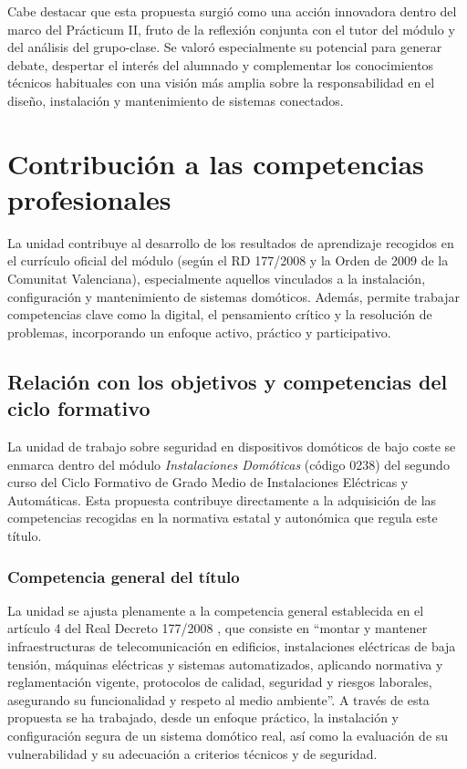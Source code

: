 Cabe destacar que esta propuesta surgió como una acción innovadora dentro del marco del Prácticum II, fruto de la reflexión conjunta con el tutor del módulo y del análisis del grupo-clase. Se valoró especialmente su potencial para generar debate, despertar el interés del alumnado y complementar los conocimientos técnicos habituales con una visión más amplia sobre la responsabilidad en el diseño, instalación y mantenimiento de sistemas conectados.


\section{Contribución a las competencias profesionales}
La unidad contribuye al desarrollo de los resultados de aprendizaje recogidos en el currículo oficial del módulo (según el RD 177/2008 y la Orden de 2009 de la Comunitat Valenciana), especialmente aquellos vinculados a la instalación, configuración y mantenimiento de sistemas domóticos. Además, permite trabajar competencias clave como la digital, el pensamiento crítico y la resolución de problemas, incorporando un enfoque activo, práctico y participativo.

\subsection{Relación con los objetivos y competencias del ciclo formativo}

La unidad de trabajo sobre seguridad en dispositivos domóticos de bajo coste se enmarca dentro del módulo \textit{Instalaciones Domóticas} (código 0238) del segundo curso del Ciclo Formativo de Grado Medio de Instalaciones Eléctricas y Automáticas. Esta propuesta contribuye directamente a la adquisición de las competencias recogidas en la normativa estatal y autonómica que regula este título.

\subsubsection{Competencia general del título}

La unidad se ajusta plenamente a la competencia general establecida en el artículo 4 del Real Decreto 177/2008 \cite{RD1772008_art4}, que consiste en “montar y mantener infraestructuras de telecomunicación en edificios, instalaciones eléctricas de baja tensión, máquinas eléctricas y sistemas automatizados, aplicando normativa y reglamentación vigente, protocolos de calidad, seguridad y riesgos laborales, asegurando su funcionalidad y respeto al medio ambiente”. A través de esta propuesta se ha trabajado, desde un enfoque práctico, la instalación y configuración segura de un sistema domótico real, así como la evaluación de su vulnerabilidad y su adecuación a criterios técnicos y de seguridad.

